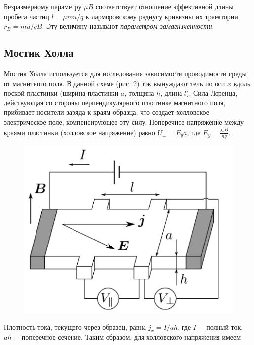 \documentclass[a4paper,12pt]{article} %
\begin{document}
\hfill \break Безразмерному параметру $\mu B$ соответствует отношение эффективной длины пробега частиц $l = \mu mu/q$ к ларморовскому радиусу кривизны их траектории $r_{B} = mu/qB$. Эту величину называют \textit{параметром замагниченности}. 

\subsection{Мостик Холла}
\hfill \break Мостик Холла используется для исследования зависимости проводимости среды от магнитного поля. В данной схеме (рис. 2) ток вынуждают течь по оси $x$ вдоль поской пластинки (ширина пластинки $a$, толщина $h$, длина $l$). Сила Лоренца, действующая со стороны перпендикулярного пластинке магнитного поля, прибивает носители заряда к краям образца, что создает холловское электрическое поле, компенсирующее эту силу. Поперечное напряжение между краями пластинки (холловское напряжение) равно $U_{\perp} = E_{y}a$, где $E_{y} = \frac{j_{x}B}{nq}$.

\begin{figure}
\begin{center}
    \includegraphics[width=1\textwidth]{3.3.4_2.png}
\end{center}
\end{figure}

\hfill \break Плотность тока, текущего через образец, равна $j_{x} = I/ah$, где $I$ $-$ полный ток, $ah$ $-$ поперечное сечение. Таким образом, для холловского напряжения имеем
\end{document}

